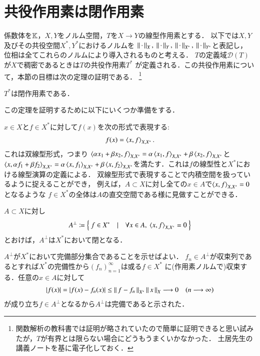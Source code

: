 \section{共役作用素は閉作用素}
	係数体を$\mathbb{K}$，$X,Y$をノルム空間，$T$を$X \rightarrow Y$の線型作用素とする．
	以下では$X,Y$及びその共役空間$X^*,Y^*$におけるノルムを
	$\Norm{\cdot}{X},\ \Norm{\cdot}{Y},\ \Norm{\cdot}{X^*},\ \Norm{\cdot}{Y^*}$と表記し，
	位相は全てこれらのノルムにより導入されるものと考える．
	$T$の定義域$\mathscr{D}(T)$が$X$で稠密であるときは$T$の共役作用素$T^*$
	が定義される．この共役作用素について，本節の目標は次の定理の証明である．
	\footnote{関数解析の教科書では証明が略されていたので簡単に証明できると思い試みたが，$T$が有界とは限らない場合にどうもうまくいかなかった．
	土居先生の講義ノートを基に電子化しておく．}
	\begin{itembox}[l]{}
		\begin{thm}
			$T^*$は閉作用素である．\label{thm:T_star_closed}
		\end{thm}
	\end{itembox}

	この定理を証明するために以下にいくつか準備をする．
	
	$x \in X$と$f \in X^*$に対して$f(x)$を次の形式で表現する:
	\begin{align}
		f(x) = \inprod<x,f>_{X,X^*}.
	\end{align}
	これは双線型形式，つまり
	$\inprod<\alpha x_1 + \beta x_2,f>_{X,X^*} = \alpha \inprod<x_1,f>_{X,X^*} + \beta\inprod<x_2,f>_{X,X^*}$と$\inprod<x,\alpha f_1 + \beta f_2>_{X,X^*} = \alpha \inprod<x,f_1>_{X,X^*} + \beta\inprod<x,f_2>_{X,X^*}$を満たす．これは$f$の線型性と$X^*$における線型演算の定義による．
	双線型形式で表現することで内積空間を扱っているように捉えることができ，
	例えば，$A \subset X$に対し全ての$x \in A$で$\inprod<x,f>_{X,X^*} = 0$となるような
	$f \in X^*$の全体は$A$の直交空間である様に見做すことができる．
	
	\begin{itembox}[l]{}
		\begin{lem}
			$A \subset X$に対し
			\begin{align}
				A^{\perp} \coloneqq \left\{\ f \in X^*\quad |\quad \forall x \in A,\ \inprod<x,f>_{X,X^*} = 0\ \right\}
			\end{align}
			とおけば，$A^{\perp}$は$X^*$において閉となる．
			\label{lem:T_star_closed_1}
		\end{lem}
	\end{itembox}
	
	\begin{prf}
		$A^{\perp}$が$X^*$において完備部分集合であることを示せばよい．
		$f_n \in A^{\perp}$が収束列であるとすれば$X^*$の完備性から$(f_n)_{n=1}^{\infty}$は或る$f \in X^*$
		に(作用素ノルムで)収束する．任意の$x \in A$に対して
		\begin{align}
			|f(x)| = |f(x) - f_n(x)| \leq \left\|\, f-f_n\, \right\|_{X^*}\left\|\, x\, \right\|_{X} \longrightarrow 0 \quad (n \longrightarrow \infty)
		\end{align}
		が成り立ち$f \in A^{\perp}$となるから$A^{\perp}$は完備であると示された．
		\QED
	\end{prf}
	
